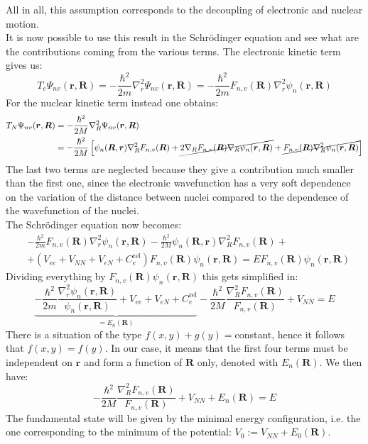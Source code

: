\documentclass[10.75pt,a4paper,openright,bottom=2cm]{article}
\renewcommand{\Vec}[1]{\boldsymbol{#1}}
\begin{document}
All in all, this assumption corresponds to the decoupling of electronic and nuclear motion.\\
It is now possible to use this result in the Schr\"odinger equation and see what are the contributions coming from the various terms. The electronic kinetic term gives us:
\[
T_e\Psi_{nv}(\Vec{r},\Vec{R})=-\frac{\hbar^2}{2m}\nabla_r^2\Psi_{nv}(\Vec{r},\Vec{R})=-\frac{\hbar^2}{2m}F_{n,v}(\Vec{R})\nabla_r^2\psi_n(\Vec{r},\Vec{R})
\]
For the nuclear kinetic term instead one obtains:
\begin{align*}
T_N\Psi_{nv}(\Vec{r},\Vec{R})&=-\frac{\hbar^2}{2M}\nabla_R^2\Psi_{nv}(\Vec{r},\Vec{R})\\
&=-\frac{\hbar^2}{2M}\left[\psi_n(\Vec{R},\Vec{r})\nabla_R^2F_{n,v}(\Vec{R})+\cancel{2\nabla_RF_{n,v}(\Vec{R})\nabla_R\psi_n(\Vec{r},\Vec{R})}+\cancel{F_{n,v}(\Vec{R})\nabla_R^2\psi_n(\Vec{r},\Vec{R})}\right]
\end{align*}
The last two terms are neglected because they give a contribution much smaller than the first one, since the electronic wavefunction has a very soft dependence on the variation of the distance between nuclei compared to the dependence of the wavefunction of the nuclei.\\
The Schr\"odinger equation now becomes:
\begin{align*}
&-\frac{\hbar^2}{2m}F_{n,v}(\Vec{R})\nabla_r^2\psi_n(\Vec{r},\Vec{R})-\frac{\hbar^2}{2M}\psi_n(\Vec{R},\Vec{r})\nabla_R^2F_{n,v}(\Vec{R})+\\
&+(V_{ee}+V_{NN}+V_{eN}+C_e^{\text{rel}})F_{n,v}(\Vec{R})\psi_n(\Vec{r},\Vec{R})=EF_{n,v}(\Vec{R})\psi_n(\Vec{r},\Vec{R})
\end{align*}
Dividing everything by $F_{n,v}(\Vec{R})\psi_n(\Vec{r},\Vec{R})$ this gets simplified in:
\[
\underbrace{-\frac{\hbar^2}{2m}\frac{\nabla_r^2\psi_n(\Vec{r},\Vec{R})}{\psi_n(\Vec{r},\Vec{R})}+V_{ee}+V_{eN}+C_e^{\text{rel}}}_{=E_n(\Vec{R})}-\frac{\hbar^2}{2M}\frac{\nabla_R^2F_{n,v}(\Vec{R})}{F_{n,v}(\Vec{R})}+V_{NN}=E
\]
There is a situation of the type $f(x,y)+g(y)=$constant, hence it follows that $f(x,y)=f(y)$. In our case, it means that the first four terms must be independent on $\Vec{r}$ and form a function of $\Vec{R}$ only, denoted with $E_n(\Vec{R})$. We then have:
\[
-\frac{\hbar^2}{2M}\frac{\nabla_R^2F_{n,v}(\Vec{R})}{F_{n,v}(\Vec{R})}+V_{NN}+E_n(\Vec{R})=E
\]
The fundamental state will be given by the minimal energy configuration, i.e. the one corresponding to the minimum of the potential: $V_0:=V_{NN}+E_0(\Vec{R})$.
\end{document}
